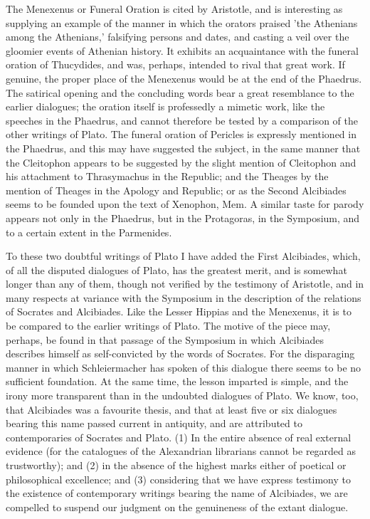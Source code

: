 \documentclass[11pt,letter]{article}
\begin{document}
\par  The Menexenus or Funeral Oration is cited by Aristotle, and is interesting as supplying an example of the manner in which the orators praised 'the Athenians among the Athenians,' falsifying persons and dates, and casting a veil over the gloomier events of Athenian history. It exhibits an acquaintance with the funeral oration of Thucydides, and was, perhaps, intended to rival that great work. If genuine, the proper place of the Menexenus would be at the end of the Phaedrus. The satirical opening and the concluding words bear a great resemblance to the earlier dialogues; the oration itself is professedly a mimetic work, like the speeches in the Phaedrus, and cannot therefore be tested by a comparison of the other writings of Plato. The funeral oration of Pericles is expressly mentioned in the Phaedrus, and this may have suggested the subject, in the same manner that the Cleitophon appears to be suggested by the slight mention of Cleitophon and his attachment to Thrasymachus in the Republic; and the Theages by the mention of Theages in the Apology and Republic; or as the Second Alcibiades seems to be founded upon the text of Xenophon, Mem. A similar taste for parody appears not only in the Phaedrus, but in the Protagoras, in the Symposium, and to a certain extent in the Parmenides.

\par  To these two doubtful writings of Plato I have added the First Alcibiades, which, of all the disputed dialogues of Plato, has the greatest merit, and is somewhat longer than any of them, though not verified by the testimony of Aristotle, and in many respects at variance with the Symposium in the description of the relations of Socrates and Alcibiades. Like the Lesser Hippias and the Menexenus, it is to be compared to the earlier writings of Plato. The motive of the piece may, perhaps, be found in that passage of the Symposium in which Alcibiades describes himself as self-convicted by the words of Socrates. For the disparaging manner in which Schleiermacher has spoken of this dialogue there seems to be no sufficient foundation. At the same time, the lesson imparted is simple, and the irony more transparent than in the undoubted dialogues of Plato. We know, too, that Alcibiades was a favourite thesis, and that at least five or six dialogues bearing this name passed current in antiquity, and are attributed to contemporaries of Socrates and Plato. (1) In the entire absence of real external evidence (for the catalogues of the Alexandrian librarians cannot be regarded as trustworthy); and (2) in the absence of the highest marks either of poetical or philosophical excellence; and (3) considering that we have express testimony to the existence of contemporary writings bearing the name of Alcibiades, we are compelled to suspend our judgment on the genuineness of the extant dialogue.
\end{document}
